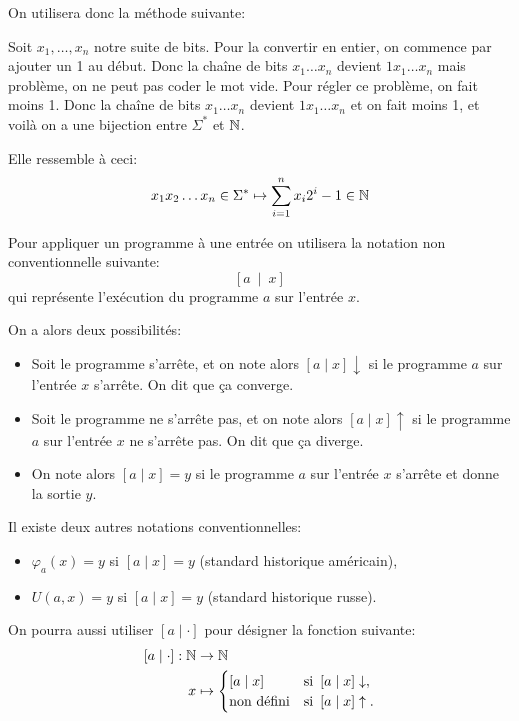 On utilisera donc la méthode suivante:

Soit \(x_1,\ldots,x_n\) notre suite de bits. Pour la convertir en entier,
on commence par ajouter un 1 au début.
Donc la chaîne de bits \(x_1\ldots x_n\) devient
\(1x_1\ldots x_n\) mais problème, on ne peut pas coder le mot vide.
Pour régler ce problème, on fait moins 1.
Donc la chaîne de bits \(x_1\ldots x_n\) devient
\(1x_1\ldots x_n\) et on fait moins 1, et voilà
on a une bijection entre \(\Sigma^*\) et \(\mathbb{N}\).

Elle ressemble à ceci:
\begin{equation*}
    x_1x_2\ldots x_n \in \Sigma^* \mapsto \sum_{i=1}^n x_i 2^i - 1 \in \mathbb{N}
\end{equation*}


Pour appliquer un programme à une entrée 
on utilisera la notation non conventionnelle suivante:
\begin{equation*}
    \left[a\ \mid\ x\right]
\end{equation*}
qui représente l'exécution du programme \(a\) sur l'entrée \(x\).

On a alors deux possibilités:
\begin{itemize}
    \item Soit le programme s'arrête, et on note alors
        \(\left[a\mid x\right]\downarrow\) si le programme \(a\) sur l'entrée \(x\)
        s'arrête. On dit que ça converge.
    \item Soit le programme ne s'arrête pas, et on note alors
        \(\left[a\mid x\right]\uparrow\) si le programme \(a\) sur l'entrée \(x\)
        ne s'arrête pas. On dit que ça diverge.
    \item On note alors
        \(\left[a\mid x\right] = y\) si le programme \(a\) sur l'entrée \(x\)
        s'arrête et donne la sortie \(y\).
\end{itemize}

Il existe deux autres notations conventionnelles:
\begin{itemize}
    \item \(\varphi_a(x) = y\) si \(\left[a\mid x\right] = y\) (standard historique américain),

    \item \(U(a,x) = y\) si \(\left[a\mid x\right] = y\) (standard historique russe).
\end{itemize}

On pourra aussi utiliser \(\left[a\mid \cdot\right]\) pour désigner la fonction  suivante:
\begin{equation*}
    \begin{aligned}
        \left[a\mid \cdot\right]: \mathbb{N} &\to \mathbb{N} \\
        x &\mapsto \begin{cases}
            \left[a\mid x\right] & \text{si } \left[a\mid x\right]\downarrow, \\
            \text{non défini} & \text{si } \left[a\mid x\right]\uparrow.
        \end{cases}
    \end{aligned}
\end{equation*}

